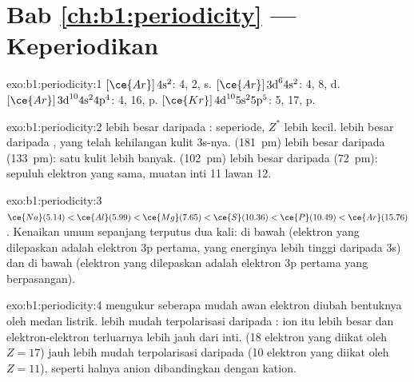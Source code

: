 \section*{Bab \ref{ch:b1:periodicity} --- Keperiodikan}

\begin{solution}{exo:b1:periodicity:1}
 $[\ce{Ar}]\,4\text{s}^2$:  4,  2,  s. 
$[\ce{Ar}]\,3\text{d}^6 4\text{s}^2$:  4,  8,  d.
 $[\ce{Ar}]\,3\text{d}^{10} 4\text{s}^2 4\text{p}^4$:  4,
 16,  p.  $[\ce{Kr}]\,4\text{d}^{10} 5\text{s}^2 5\text{p}^5$:  5,  17,  p.
\end{solution}

\begin{solution}{exo:b1:periodicity:2}
 lebih besar daripada : seperiode, $Z^{*}$ lebih kecil.
 lebih besar daripada , yang telah kehilangan kulit
3s-nya.  (\qty{181}{pm}) lebih besar daripada 
(\qty{133}{pm}): satu kulit lebih banyak.  (\qty{102}{pm}) lebih
besar daripada  (\qty{72}{pm}): sepuluh elektron yang sama,
muatan inti 11 lawan 12.
\end{solution}

\begin{solution}{exo:b1:periodicity:3}
$\ce{Na} (5.14) < \ce{Al} (5.99) < \ce{Mg} (7.65) < \ce{S} (10.36) <
\ce{P} (10.49) < \ce{Ar} (15.76)$. Kenaikan umum sepanjang 
terputus dua kali:  di bawah  (elektron yang dilepaskan
adalah elektron 3p pertama, yang energinya lebih tinggi daripada 3s) dan
 di bawah  (elektron yang dilepaskan adalah elektron 3p
pertama yang berpasangan).
\end{solution}

\begin{solution}{exo:b1:periodicity:4}
 mengukur seberapa mudah awan elektron diubah bentuknya
oleh medan listrik.  lebih mudah terpolarisasi daripada :
ion itu lebih besar dan elektron-elektron terluarnya lebih jauh dari inti.
 (18 elektron yang diikat oleh $Z = 17$) jauh lebih mudah
terpolarisasi daripada  (10 elektron yang diikat oleh $Z = 11$),
seperti halnya anion dibandingkan dengan kation.
\end{solution}


